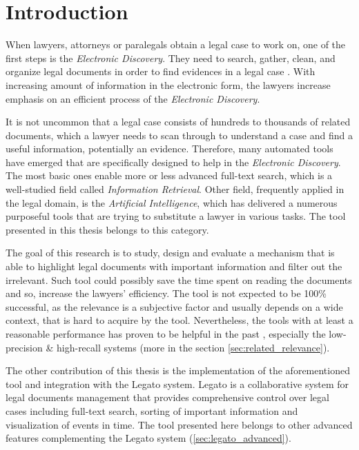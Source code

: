 \documentclass[
  digital, %
  notable,   %
  nolof,     %
  nolot,     %
]{fithesis3}
\begin{document}
\chapter*{Introduction}
When lawyers, attorneys or paralegals obtain a legal case to work on, one of the first steps is the \textit{Electronic Discovery}.
They need to search, gather, clean, and organize legal documents in order to find evidences in a legal case \cite{Conrad2010ediscovery}.
With increasing amount of information in the electronic form, the lawyers increase emphasis on an efficient process of the \textit{Electronic Discovery}.

It is not uncommon that a legal case consists of hundreds to thousands of related documents, which a lawyer needs to scan through to understand a case and find a useful information, potentially an evidence.
Therefore, many automated tools have emerged that are specifically designed to help in the \textit{Electronic Discovery}.
The most basic ones enable more or less advanced full-text search, which is a well-studied field called \textit{Information Retrieval}.
Other field, frequently applied in the legal domain, is the \textit{Artificial Intelligence}, which has delivered a numerous purposeful tools that are trying to substitute a lawyer in various tasks.
The tool presented in this thesis belongs to this category.

The goal of this research is to study, design and evaluate a mechanism that is able to highlight legal documents with important information and filter out the irrelevant.
Such tool could possibly save the time spent on reading the documents and so, increase the lawyers' efficiency.
The tool is not expected to be 100\% successful, as the relevance is a subjective factor and usually depends on a wide context, that is hard to acquire by the tool.
Nevertheless, the tools with at least a reasonable performance has proven to be helpful in the past \cite{roitblat2010comparison}, especially the low-precision \& high-recall systems (more in the section \ref{sec:related_relevance}).

The other contribution of this thesis is the implementation of the aforementioned tool and integration with the Legato system. 
Legato is a collaborative system for legal documents management that provides comprehensive control over legal cases including full-text search, sorting of important information and visualization of events in time.
The tool presented here belongs to other advanced features complementing the Legato system (\ref{sec:legato_advanced}).
\end{document}
